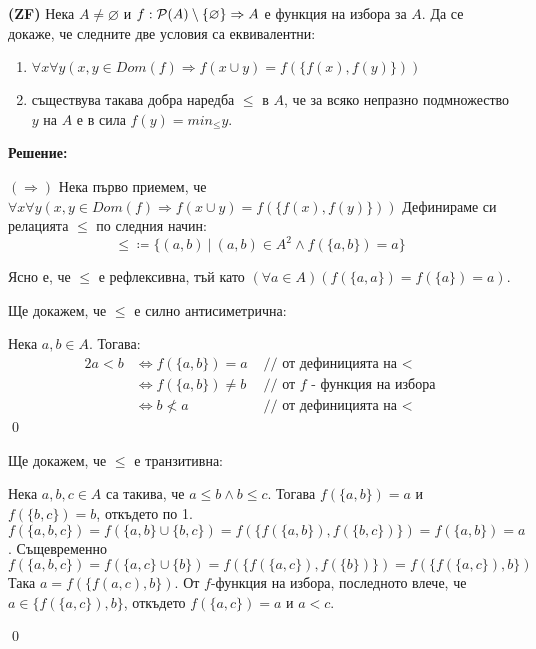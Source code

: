 \begin{problem}
\textbf{(ZF)}
Нека $A \neq \varnothing$ и $f: \mathcal{P}(A) \setminus \{\varnothing \} \Rightarrow A$ е функция на избора за $A$.
Да се докаже, че следните две условия са еквивалентни:
\begin{enumerate}
\item
$\forall x \forall y (x, y \in Dom(f) \Rightarrow f(x \cup y) = f(\{ f(x), f(y) \}) )$

\item
съществува такава добра наредба $\leq$ в $A$, че за всяко непразно подмножество $y$ на $A$ е в сила $f(y) = min_{\leq} y$.
\end{enumerate}

\end{problem}

\textbf{Решение:}

\smallbreak
\quad
$(\Rightarrow)$ Нека първо приемем, че
$\forall x \forall y (x, y \in Dom(f) \Rightarrow f(x \cup y) = f(\{ f(x), f(y) \}) )$
Дефинираме си релацията $\leq$ по следния начин:
\[
\leq \coloneq \{ (a, b)\ |\ (a, b) \in A^2 \land f(\{a, b\}) = a \}
\]

\quad
Ясно е, че $\leq$ е рефлексивна, тъй като $(\forall a \in A)(f(\{a, a\}) = f(\{a\}) = a)$.

\quad
Ще докажем, че  $\leq$ е силно антисиметрична:

\begin{tcolorbox}[mybox, title={Доказателство:}]
\quad
Нека $a, b \in A$. Тогава:
\begin{alignat*}{2}
a < b & \iff f(\{a, b\}) = a        & \text{ // от дефиницията на $<$ } \\
      & \iff f(\{a, b\}) \neq b     & \text{ // от $f$ - функция на избора} \\
      & \iff b \not< a              & \text{ // от дефиницията на $<$}
\end{alignat*}
\qed
\end{tcolorbox}

\quad
Ще докажем, че  $\leq$ е транзитивна:

\begin{tcolorbox}[mybox, title={Доказателство:}]
\quad
Нека $a, b, c \in A$ са такива, че $a \leq b \land b \leq c$.
Тогава $f(\{a, b\}) = a$ и $f(\{b, c\}) = b$, откъдето по 1.
$f(\{a, b, c\}) = f(\{a, b\} \cup \{b, c\}) = f(\{f(\{a, b\}), f(\{b,c\})\}) = f(\{a, b\}) = a$.
Същевременно
$f(\{a, b, c\}) = f(\{a, c\} \cup \{b\}) = f(\{f(\{a, c\}), f(\{b\})\}) = f(\{f(\{a, c\}), b\})$
Така $a = f(\{f(a, c), b\})$.
От $f$-функция на избора, последното влече, че $a \in \{f(\{a, c\}), b\}$,
откъдето $f(\{a, c\}) = a$ и $a < c$.

\qed
\end{tcolorbox}

